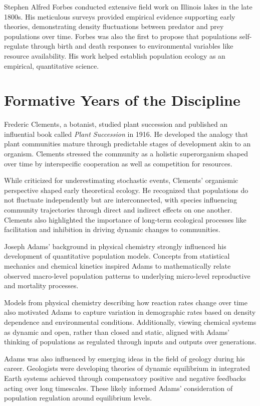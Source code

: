 Stephen Alfred Forbes conducted extensive field work on Illinois lakes in the late 1800s. His meticulous surveys provided empirical evidence supporting early theories, demonstrating density fluctuations between predator and prey populations over time. Forbes was also the first to propose that populations self-regulate through birth and death responses to environmental variables like resource availability. His work helped establish population ecology as an empirical, quantitative science.

\section{Formative Years of the Discipline}

Frederic Clements, a botanist, studied plant succession and published an influential book called \emph{Plant Succession} in 1916. He developed the analogy that plant communities mature through predictable stages of development akin to an organism. Clements stressed the community as a holistic superorganism shaped over time by interspecific cooperation as well as competition for resources.

While criticized for underestimating stochastic events, Clements' organismic perspective shaped early theoretical ecology. He recognized that populations do not fluctuate independently but are interconnected, with species influencing community trajectories through direct and indirect effects on one another. Clements also highlighted the importance of long-term ecological processes like facilitation and inhibition in driving dynamic changes to communities.

Joseph Adams' background in physical chemistry strongly influenced his development of quantitative population models. Concepts from statistical mechanics and chemical kinetics inspired Adams to mathematically relate observed macro-level population patterns to underlying micro-level reproductive and mortality processes.

Models from physical chemistry describing how reaction rates change over time also motivated Adams to capture variation in demographic rates based on density dependence and environmental conditions. Additionally, viewing chemical systems as dynamic and open, rather than closed and static, aligned with Adams' thinking of populations as regulated through inputs and outputs over generations.

Adams was also influenced by emerging ideas in the field of geology during his career. Geologists were developing theories of dynamic equilibrium in integrated Earth systems achieved through compensatory positive and negative feedbacks acting over long timescales. These likely informed Adams' consideration of population regulation around equilibrium levels.

